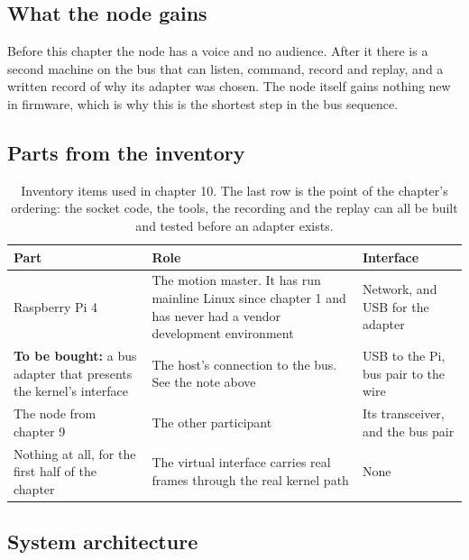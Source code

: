 \subsection*{What the node gains}

Before this chapter the node has a voice and no audience. After it there is a
second machine on the bus that can listen, command, record and replay, and a
written record of why its adapter was chosen. The node itself gains nothing new
in firmware, which is why this is the shortest step in the bus sequence.

\subsection*{Parts from the inventory}

\begin{table}[H]\centering\small
\begin{tabular}{p{40mm}p{66mm}p{40mm}}
\toprule
Part & Role & Interface \\
\midrule
Raspberry Pi 4 & The motion master. It has run mainline Linux since chapter 1 and has never had a vendor development environment & Network, and USB for the adapter \\
\textbf{To be bought:} a bus adapter that presents the kernel's interface & The host's connection to the bus. See the note above & USB to the Pi, bus pair to the wire \\
The node from chapter 9 & The other participant & Its transceiver, and the bus pair \\
Nothing at all, for the first half of the chapter & The virtual interface carries real frames through the real kernel path & None \\
\bottomrule
\end{tabular}
\caption{Inventory items used in chapter 10. The last row is the point of the chapter's ordering: the socket code, the tools, the recording and the replay can all be built and tested before an adapter exists.}
\end{table}

\subsection*{System architecture}


